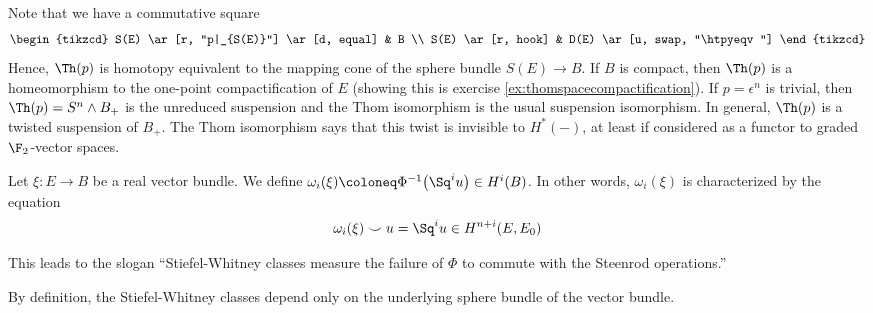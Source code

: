 Note that we have a commutative square
\begin{equation*}
	\begin{tikzcd}
		S(E)
				\ar[r, "p|_{S(E)}"]
				\ar[d, equal]
			& B
		\\
		S(E)
				\ar[r, hook]
			& D(E)
				\ar[u, swap, "\htpyeqv"]
	\end{tikzcd}
\end{equation*}
Hence, $\Th(p)$ is homotopy equivalent to the mapping cone of the sphere bundle $S(E) \to B$.
If $B$ is compact, then $\Th(p)$ is a homeomorphism to the one-point compactification of $E$ (showing this is exercise \ref{ex:thomspacecompactification}).
If $p = \epsilon^n$ is trivial, then $\Th(p) = S^n \wedge B_{+}$ is the unreduced suspension and the Thom isomorphism is the usual suspension isomorphism.
In general, $\Th(p)$ is a twisted suspension of $B_{+}$.
The Thom isomorphism says that this twist is invisible to $H^*({{-}})$, at least if considered as a functor to graded $\F_2$-vector spaces.
\begin{definition}
	Let $\xi\colon E \to B$ be a real vector bundle.
	We define $\omega_i(\xi) \coloneq \Phi^{-1}\big(\Sq^i u\big) \in H^i(B)$.
	In other words, $\omega_i(\xi)$ is characterized by the equation
	\begin{equation*}
		\omega_i(\xi) \smile u = \Sq^i u \in H^{n + i}(E, E_0)
	\end{equation*}
\end{definition}
This leads to the slogan \enquote{Stiefel-Whitney classes measure the failure of $\Phi$ to commute with the Steenrod operations.}
\begin{remark}
	By definition, the Stiefel-Whitney classes depend only on the underlying sphere bundle of the vector bundle.
\end{remark}
